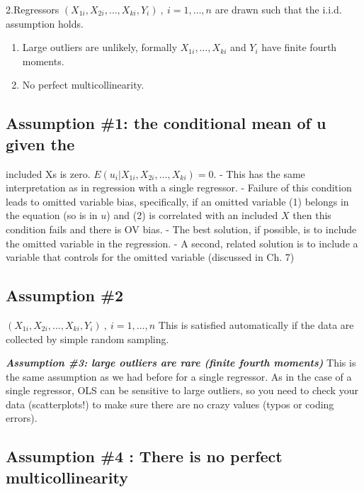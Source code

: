 \documentclass[
  letterpaper,
  DIV=11,
  numbers=noendperiod]{scrartcl}
\providecommand{\tightlist}{%
  \setlength{\itemsep}{0pt}\setlength{\parskip}{0pt}}\usepackage{longtable,booktabs,array}
\begin{document}
2.Regressors \((X_{1i}, X_{2i}, \dots, X_{ki}, Y_i) \ , \ i=1,\dots,n\)
are drawn such that the i.i.d. assumption holds.

\begin{enumerate}
\def\labelenumi{\arabic{enumi}.}
\setcounter{enumi}{2}
\tightlist
\item
  Large outliers are unlikely, formally \(X_{1i},\dots,X_{ki}\) and
  \(Y_i\) have finite fourth moments.
\item
  No perfect multicollinearity.
\end{enumerate}

\hypertarget{assumption-1-the-conditional-mean-of-u-given-the}{%
\subsection{Assumption \#1: the conditional mean of u given
the}\label{assumption-1-the-conditional-mean-of-u-given-the}}

included Xs is zero. \(E(u_i\vert X_{1i}, X_{2i}, \dots, X_{ki}) = 0.\)
- This has the same interpretation as in regression with a single
regressor. - Failure of this condition leads to omitted variable bias,
specifically, if an omitted variable (1) belongs in the equation (so is
in \(u\)) and (2) is correlated with an included \(X\) then this
condition fails and there is OV bias. - The best solution, if possible,
is to include the omitted variable in the regression. - A second,
related solution is to include a variable that controls for the omitted
variable (discussed in Ch. 7)

\hypertarget{assumption-2}{%
\subsection{Assumption \#2}\label{assumption-2}}

\((X_{1i}, X_{2i}, \dots, X_{ki}, Y_i) \ , \ i=1,\dots,n\) This is
satisfied automatically if the data are collected by simple random
sampling.

\textbf{\emph{Assumption \#3: large outliers are rare (finite fourth
moments)}} This is the same assumption as we had before for a single
regressor. As in the case of a single regressor, OLS can be sensitive to
large outliers, so you need to check your data (scatterplots!) to make
sure there are no crazy values (typos or coding errors).

\hypertarget{assumption-4-there-is-no-perfect-multicollinearity}{%
\subsection{Assumption \#4 : There is no perfect
multicollinearity}\label{assumption-4-there-is-no-perfect-multicollinearity}}
\end{document}
